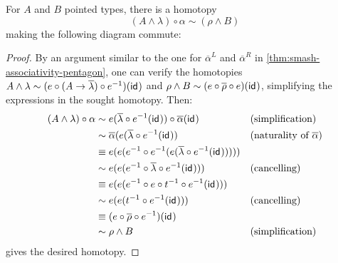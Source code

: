 \documentclass{article}
\renewcommand{\smash}{\wedge}
\renewcommand{\o}{\ensuremath{\circ}}
\newcommand{\sy}{^{-1}}
\newcommand{\alphabar}{\overline{\alpha}}
\newcommand{\rhobar}{\overline{\rho}}
\newcommand{\lambdabar}{\overline{\lambda}}
\newcommand{\two}{\mathbf{2}}
\begin{document}
\begin{thm}\label{thm:smash-unitors-triangle}
	For $A$ and $B$ pointed types, there is a homotopy
	\[(A \smash \lambda) \o \alpha \sim (\rho \smash B)\]
	making the following diagram commute:
	\begin{center}
	\end{center}
\end{thm}
\begin{proof}
	By an argument similar to the one for $\alphabar^L$ and $\alphabar^R$ in \autoref{thm:smash-associativity-pentagon}, one can verify the homotopies $A \smash \lambda \sim (e \o (A \to \lambdabar) \o e\sy)(\idfunc)$ and $\rho \smash B \sim (e \o \rhobar \o e)(\idfunc)$, simplifying the expressions in the sought homotopy. Then:
	\begin{align*}
		(A \smash \lambda) \o \alpha
		&\sim e(\lambdabar \o e\sy(\idfunc)) \o \alphabar(\idfunc) &&\text{(simplification)}\\
		&\sim \alphabar(e(\lambdabar \o e\sy(\idfunc)) &&\text{(naturality of $\alphabar$)}\\
		&\judgeq e(e(e\sy \o e\sy (e(\lambdabar \o e\sy(\idfunc)))))\\
		&\sim e(e(e\sy \o \lambdabar \o e\sy(\idfunc))) &&\text{(cancelling)}\\
		&\judgeq e(e(e\sy \o e \o t\sy \o e\sy(\idfunc)))\\
		&\sim e(e(t\sy \o e\sy(\idfunc))) &&\text{(cancelling)}\\
		&\judgeq (e \o \rhobar \o e\sy)(\idfunc)\\
		&\sim \rho \smash B &&\text{(simplification)}
	\end{align*}
	gives the desired homotopy.
\end{proof}
\end{document}
